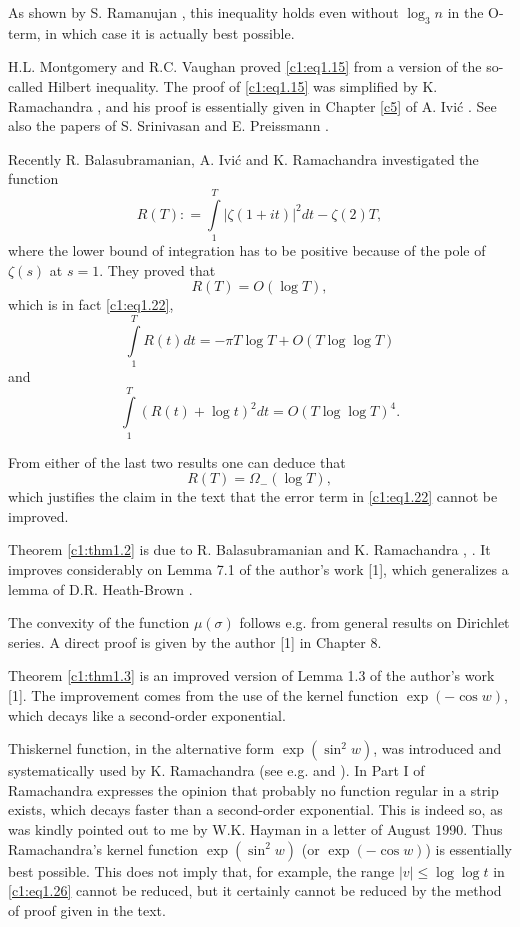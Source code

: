 As shown by S. Ramanujan \cite{Ramanujan1}, this inequality holds even without
$\log_3 n$ in the O-term, in which case it is actually best possible.

H.L. Montgomery and R.C. Vaughan \cite{Montgomery and Vaughan1}\pageoriginale proved \eqref{c1:eq1.15} from a version of the so-called Hilbert
inequality. The proof of \eqref{c1:eq1.15} was simplified by
K. Ramachandra \cite{Ramachandra4}, and his proof is essentially given in Chapter
\ref{c5} of A. Ivi\'c \cite{Ivic1}. See also the papers of S. Srinivasan \cite{Srinivasan1} and E. Preissmann \cite{Preissmann1}.

Recently R. Balasubramanian, A. Ivi\'c and K. Ramachandra \cite{Balasubramanian Ivic and Ramachandra1} investigated the function 
$$
R(T) : = \int\limits_1^T |\zeta (1+ it)|^2 dt - \zeta(2) T,
$$
where the lower bound of integration has to be positive because of the
pole of $\zeta (s)$ at $s=1$. They proved that
$$
R(T) = O(\log T),
$$
which is in fact \eqref{c1:eq1.22},
$$
\int\limits_1^T R(t) dt =- \pi T \log T + O (T \log \log T)
$$
and 
$$
\int\limits_1^T (R(t)+ \log t)^2 dt =O (T \log \log T)^4.
$$

From either of the last two results one can deduce that
$$
R(T) = \Omega_- (\log T),
$$
which justifies the claim in the text that the error term in
\eqref{c1:eq1.22} cannot be improved.

Theorem \ref{c1:thm1.2} is due to R. Balasubramanian and
K. Ramachandra \cite{Balasubramanian and Ramachandra3}, \cite{Balasubramanian and Ramachandra4}. It improves considerably on Lemma 7.1 of the author's work [1], which generalizes a
lemma of D.R. Heath-Brown \cite{Heath-Brown1}.

The convexity of the function $\mu (\sigma)$ follows e.g. from general
results on Dirichlet series. A direct proof is given by the author
[1] in Chapter 8.

Theorem \ref{c1:thm1.3} is an improved version of Lemma
1.3 of the author's work [1]. The improvement comes
from the use of the kernel function $\exp (- \cos w)$, which decays
like a second-order exponential. 

This\pageoriginale kernel function, in the alternative form $\exp
(\sin^2 w)$, was introduced and systematically used by K. Ramachandra
(see e.g. \cite{Ramachandra2} and \cite{Ramachandra6}). In Part I of \cite{Ramachandra6} Ramachandra
expresses the opinion that probably no function regular in a strip
exists, which decays faster than a second-order exponential. This is
indeed so, as was kindly pointed out to me by W.K. Hayman in a letter
of August 1990. Thus Ramachandra's kernel function $\exp (\sin^2 w)$
(or $\exp (- \cos w)$) is essentially best possible. This does not
imply that, for example, the range $|v|\leq \log \log t$ in
\eqref{c1:eq1.26} cannot be reduced, but it certainly cannot be
reduced by the method of proof given in the text.

